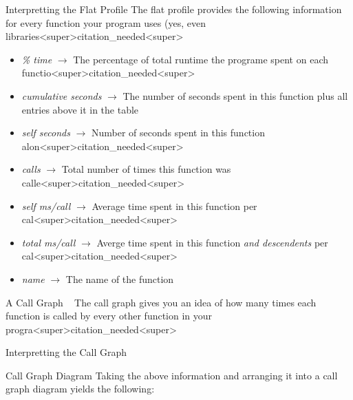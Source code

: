 \documentclass[11pt]{beamer}
\begin{document}
\begin{frame}{Interpretting the Flat Profile}
The flat profile provides the following information for every function your program uses (yes, even libraries<super>citation_needed<super>
\begin{itemize}
\item \textit{\% time} $\rightarrow$ The percentage of total runtime the programe spent on each functio<super>citation_needed<super>
\item \textit{cumulative seconds} $\rightarrow$ The number of seconds spent in this function plus all entries above it in the table  
\item \textit{self seconds} $\rightarrow$ Number of seconds spent in this function alon<super>citation_needed<super>
\item \textit{calls} $\rightarrow$ Total number of times this function was calle<super>citation_needed<super>
\item \textit{self ms/call} $\rightarrow$ Average time spent in this function per cal<super>citation_needed<super>
\item \textit{total ms/call} $\rightarrow$ Averge time spent in this function \emph{and descendents} per cal<super>citation_needed<super>
\item \textit{name} $\rightarrow$ The name of the function
\end{itemize}
\end{frame}


\begin{frame}[fragile=singleslide]{A Call Graph}
\center
\
\flushleft
The call graph gives you an idea of how many times each function is called by every other function in your progra<super>citation_needed<super>  
\end{frame}


\begin{frame}{Interpretting the Call Graph}
\center
\
\end{frame}

\begin{frame}{Call Graph Diagram}
Taking the above information and arranging it into a call graph diagram yields the following:

\center
\
\end{frame}
\end{document}
